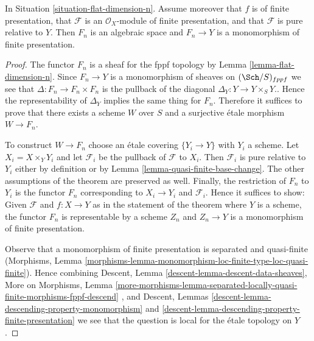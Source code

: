 \begin{theorem}
\label{theorem-flat-dimension-n-representable}
In Situation \ref{situation-flat-dimension-n}.
Assume moreover that $f$ is of finite presentation, that
$\mathcal{F}$ is an $\mathcal{O}_X$-module of finite presentation,
and that $\mathcal{F}$ is pure relative to $Y$.
Then $F_n$ is an algebraic space and
$F_n \to Y$ is a monomorphism of finite presentation.
\end{theorem}

\begin{proof}
The functor $F_n$ is a sheaf for the fppf topology by
Lemma \ref{lemma-flat-dimension-n}.
Since $F_n \to Y$ is a monomorphism of sheaves on
$(\Sch/S)_{fppf}$ we see that $\Delta : F_n \to F_n \times F_n$
is the pullback of the diagonal $\Delta_Y : Y \to Y \times_S Y$..
Hence the representability of $\Delta_Y$ implies the same
thing for $F_n$. Therefore it suffices to prove that
there exists a scheme $W$ over $S$ and a surjective \'etale morphism
$W \to F_n$.

\medskip\noindent
To construct $W \to F_n$ choose an \'etale covering $\{Y_i \to Y\}$
with $Y_i$ a scheme. Let $X_i = X \times_Y Y_i$ and let
$\mathcal{F}_i$ be the pullback of $\mathcal{F}$ to $X_i$.
Then $\mathcal{F}_i$ is pure relative to $Y_i$ either by definition
or by Lemma \ref{lemma-quasi-finite-base-change}.
The other assumptions of the theorem are preserved as well.
Finally, the restriction of $F_n$ to $Y_i$ is
the functor $F_n$ corresponding to $X_i \to Y_i$ and $\mathcal{F}_i$.
Hence it suffices to show: Given $\mathcal{F}$ and $f : X \to Y$
as in the statement of the theorem where $Y$ is a scheme, the
functor $F_n$ is representable by a scheme $Z_n$ and
$Z_n \to Y$ is a monomorphism of finite presentation.

\medskip\noindent
Observe that a monomorphism of finite presentation is
separated and quasi-finite (Morphisms, Lemma
\ref{morphisms-lemma-monomorphism-loc-finite-type-loc-quasi-finite}).
Hence combining
Descent, Lemma \ref{descent-lemma-descent-data-sheaves},
More on Morphisms, Lemma
\ref{more-morphisms-lemma-separated-locally-quasi-finite-morphisms-fppf-descend}
, and
Descent, Lemmas \ref{descent-lemma-descending-property-monomorphism} and
\ref{descent-lemma-descending-property-finite-presentation}
we see that the question is local for the \'etale topology on $Y$.


\end{proof}
